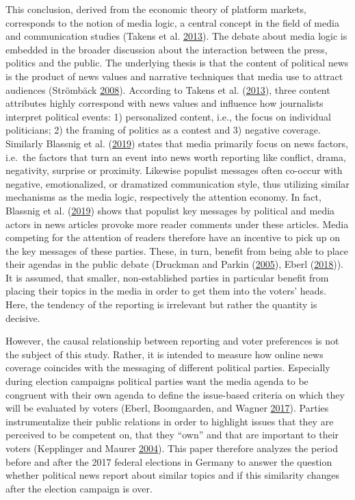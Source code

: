 \documentclass[
]{article}
\begin{document}
This conclusion, derived from the economic theory of platform markets,
corresponds to the notion of media logic, a central concept in the field
of media and communication studies (Takens et al.
\protect\hyperlink{ref-takens_media_2013}{2013}). The debate about media
logic is embedded in the broader discussion about the interaction
between the press, politics and the public. The underlying thesis is
that the content of political news is the product of news values and
narrative techniques that media use to attract audiences (Strömbäck
\protect\hyperlink{ref-stromback_four_2008}{2008}). According to Takens
et al. (\protect\hyperlink{ref-takens_media_2013}{2013}), three content
attributes highly correspond with news values and influence how
journalists interpret political events: 1) personalized content, i.e.,
the focus on individual politicians; 2) the framing of politics as a
contest and 3) negative coverage. Similarly Blassnig et al.
(\protect\hyperlink{ref-blassnig_hitting_2019}{2019}) states that media
primarily focus on news factors, i.e.~the factors that turn an event
into news worth reporting like conflict, drama, negativity, surprise or
proximity. Likewise populist messages often co-occur with negative,
emotionalized, or dramatized communication style, thus utilizing similar
mechanisms as the media logic, respectively the attention economy. In
fact, Blassnig et al.
(\protect\hyperlink{ref-blassnig_hitting_2019}{2019}) shows that
populist key messages by political and media actors in news articles
provoke more reader comments under these articles. Media competing for
the attention of readers therefore have an incentive to pick up on the
key messages of these parties. These, in turn, benefit from being able
to place their agendas in the public debate (Druckman and Parkin
(\protect\hyperlink{ref-druckman_impact_2005}{2005}), Eberl
(\protect\hyperlink{ref-eberl_lying_2018}{2018})). It is assumed, that
smaller, non-established parties in particular benefit from placing
their topics in the media in order to get them into the voters' heads.
Here, the tendency of the reporting is irrelevant but rather the
quantity is decisive.

However, the causal relationship between reporting and voter preferences
is not the subject of this study. Rather, it is intended to measure how
online news coverage coincides with the messaging of different political
parties. Especially during election campaigns political parties want the
media agenda to be congruent with their own agenda to define the
issue-based criteria on which they will be evaluated by voters (Eberl,
Boomgaarden, and Wagner \protect\hyperlink{ref-eberl_one_2017}{2017}).
Parties instrumentalize their public relations in order to highlight
issues that they are perceived to be competent on, that they ``own'' and
that are important to their voters (Kepplinger and Maurer
\protect\hyperlink{ref-kepplinger_einfluss_2004}{2004}). This paper
therefore analyzes the period before and after the 2017 federal
elections in Germany to answer the question whether political news
report about similar topics and if this similarity changes after the
election campaign is over.
\end{document}
